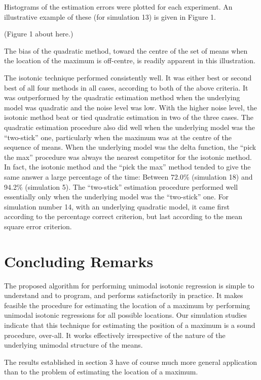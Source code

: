 Histograms of the estimation errors were plotted for each
experiment.  An illustrative example of these (for
simulation 13) is given in Figure 1.

\begin{centre} (Figure 1 about here.) \end{centre}

The bias of the quadratic method, toward the centre of the
set of means when the location of the maximum is
off-centre, is readily apparent in this illustration.

The isotonic technique performed consistently well.  It was
either best or second best of all four methods in all
cases, according to both of the above criteria.  It was
outperformed by the quadratic estimation method when the
underlying model was quadratic and the noise level was
low.  With the higher noise level, the isotonic method beat
or tied quadratic estimation in two of the three cases.
The quadratic estimation procedure also did well when the
underlying model was the ``two-stick'' one, particularly
when the maximum was at the centre of the sequence of
means.  When the underlying model was the delta function,
the ``pick the max'' procedure was always the nearest
competitor for the isotonic method.  In fact, the isotonic
method and the ``pick the max'' method tended to give the
same answer a large percentage of the time:  Between 72.0\%
(simulation 18) and 94.2\% (simulation 5).  The
``two-stick'' estimation procedure performed well
essentially only when the underlying model was the
``two-stick'' one.  For simulation number 14, with an
underlying quadratic model, it came first according to the
percentage correct criterion, but last according to the
mean square error criterion.

\section{Concluding Remarks}
\label{concl}
The proposed algorithm for performing unimodal isotonic
regression is simple to understand and to program, and
performs satisfactorily in practice.  It makes feasible the
procedure for estimating the location of a maximum by
performing unimodal isotonic regressions for all possible
locations.  Our simulation studies indicate that this
technique for estimating the position of a maximum is a
sound procedure, over-all.  It works effectively
irrespective of the nature of the underlying unimodal
structure of the means.

The results established in section 3 have of course much
more general application than to the problem of estimating
the location of a maximum.

